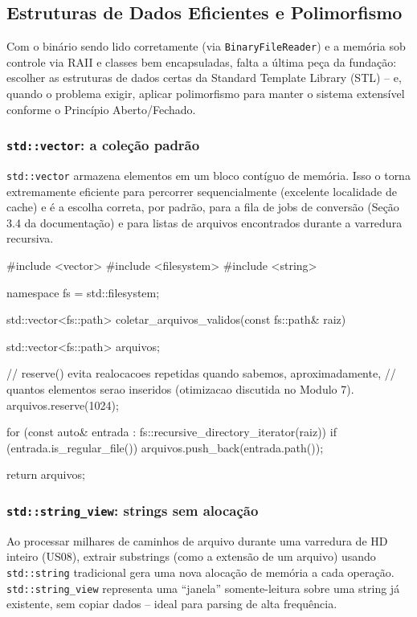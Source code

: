 \subsection{Estruturas de Dados Eficientes e Polimorfismo}

Com o binário sendo lido corretamente (via \texttt{BinaryFileReader}) e a memória sob controle via RAII e classes bem encapsuladas, falta a última peça da fundação: escolher as estruturas de dados certas da Standard Template Library (STL) -- e, quando o problema exigir, aplicar polimorfismo para manter o sistema extensível conforme o Princípio Aberto/Fechado.

\subsubsection{\texttt{std::vector}: a coleção padrão}

\texttt{std::vector} armazena elementos em um bloco contíguo de memória. Isso o torna extremamente eficiente para percorrer sequencialmente (excelente localidade de cache) e é a escolha correta, por padrão, para a fila de jobs de conversão (Seção 3.4 da documentação) e para listas de arquivos encontrados durante a varredura recursiva.

\begin{CaixaCodigo}
#include <vector>
#include <filesystem>
#include <string>

namespace fs = std::filesystem;

std::vector<fs::path> coletar_arquivos_validos(const fs::path& raiz) {
    std::vector<fs::path> arquivos;

    // reserve() evita realocacoes repetidas quando sabemos, aproximadamente,
    // quantos elementos serao inseridos (otimizacao discutida no Modulo 7).
    arquivos.reserve(1024);

    for (const auto& entrada : fs::recursive_directory_iterator(raiz)) {
        if (entrada.is_regular_file()) {
            arquivos.push_back(entrada.path());
        }
    }

    return arquivos;
}
\end{CaixaCodigo}

\subsubsection{\texttt{std::string\_view}: strings sem alocação}

Ao processar milhares de caminhos de arquivo durante uma varredura de HD inteiro (US08), extrair substrings (como a extensão de um arquivo) usando \texttt{std::string} tradicional gera uma nova alocação de memória a cada operação. \texttt{std::string\_view} representa uma ``janela'' somente-leitura sobre uma string já existente, sem copiar dados -- ideal para parsing de alta frequência.

